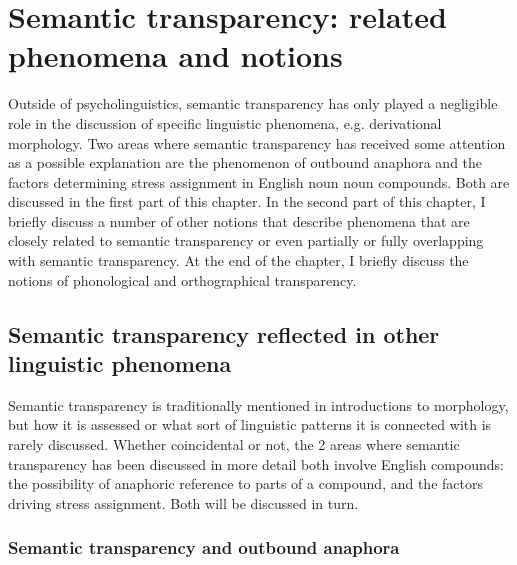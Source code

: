 \chapter[Related phenomena and notions]{Semantic transparency: related phenomena and notions}
\label{cha:theo}

Outside of psycholinguistics, semantic transparency has only played a negligible role in the
discussion of specific linguistic phenomena, e.g. derivational morphology. Two areas where semantic
transparency has received some attention as a possible explanation are
the phenomenon of outbound anaphora and the factors determining stress
assignment in English noun noun compounds. Both are discussed in
the first part of this chapter. In the second part of this chapter, I briefly
discuss a number of other notions that describe phenomena that are closely related to semantic transparency or even partially
or fully overlapping with semantic transparency. At the end of the chapter, I briefly
discuss the notions of phonological and orthographical transparency.

\section{Semantic transparency reflected in other linguistic phenomena}

Semantic transparency is traditionally mentioned in introductions to
morphology, but how it is assessed or what sort of linguistic patterns it is
connected with is rarely discussed. Whether coincidental or not, the
2 areas where semantic transparency has been discussed in more
detail both involve English compounds: the possibility of anaphoric
reference to parts of a compound, and the factors driving
stress assignment.
Both will be discussed in turn.

\subsection{Semantic transparency and outbound anaphora}
\label{sec:outbound_anaphora}

